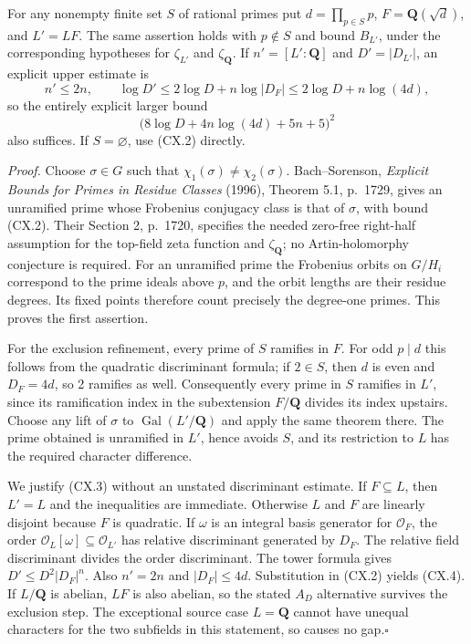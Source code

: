 \documentclass[11pt,a4paper]{article}
\begin{document}
For any nonempty finite set $S$ of rational primes put
$d=\prod_{p\in S}p$, $F=\mathbf Q(\sqrt d)$, and $L'=LF$.
The same assertion holds with $p\notin S$ and bound $B_{L'}$, under the
corresponding hypotheses for $\zeta_{L'}$ and $\zeta_{\mathbf Q}$.
If $n'=[L':\mathbf Q]$ and $D'=|D_{L'}|$, an explicit upper estimate is
\[
 n'\leq2n,\qquad \log D'\leq2\log D+n\log|D_F|
                     \leq2\log D+n\log(4d),               \tag{CX.3}
\]
so the entirely explicit larger bound
\[
        \bigl(8\log D+4n\log(4d)+5n+5\bigr)^2            \tag{CX.4}
\]
also suffices. If $S=\varnothing$, use (CX.2) directly.

\emph{Proof.} Choose $\sigma\in G$ such that
$\chi_1(\sigma)\ne\chi_2(\sigma)$. Bach--Sorenson,
\emph{Explicit Bounds for Primes in Residue Classes} (1996), Theorem 5.1,
p.~1729, gives an unramified prime whose Frobenius conjugacy class is that
of $\sigma$, with bound (CX.2). Their Section 2, p.~1720, specifies the
needed zero-free right-half assumption for the top-field zeta function and
$\zeta_{\mathbf Q}$; no Artin-holomorphy conjecture is required.
For an unramified prime the Frobenius orbits on $G/H_i$ correspond to the
prime ideals above $p$, and the orbit lengths are their residue degrees.
Its fixed points therefore count precisely the degree-one primes.
This proves the first assertion.

For the exclusion refinement, every prime of $S$ ramifies in $F$. For odd
$p\mid d$ this follows from the quadratic discriminant formula; if $2\in S$,
then $d$ is even and $D_F=4d$, so 2 ramifies as well. Consequently every
prime in $S$ ramifies in $L'$, since its ramification index in the subextension
$F/\mathbf Q$ divides its index upstairs. Choose any lift of $\sigma$ to
$\operatorname{Gal}(L'/\mathbf Q)$ and apply the same theorem there. The
prime obtained is unramified in $L'$, hence avoids $S$, and its restriction
to $L$ has the required character difference.

We justify (CX.3) without an unstated discriminant estimate. If $F\subseteq L$,
then $L'=L$ and the inequalities are immediate. Otherwise $L$ and $F$ are
linearly disjoint because $F$ is quadratic. If $\omega$ is an integral basis
generator for $\mathcal O_F$, the order $\mathcal O_L[\omega]\subseteq
\mathcal O_{L'}$ has relative discriminant generated by $D_F$. The relative
field discriminant divides the order discriminant. The tower formula gives
$D'\leq D^2|D_F|^n$. Also $n'=2n$ and $|D_F|\leq4d$.
Substitution in (CX.2) yields (CX.4). If $L/\mathbf Q$ is abelian, $LF$ is
also abelian, so the stated $A_D$ alternative survives the exclusion step.
The exceptional source case $L=\mathbf Q$ cannot have unequal characters
for the two subfields in this statement, so causes no gap.\hfill$\square$
\end{document}
